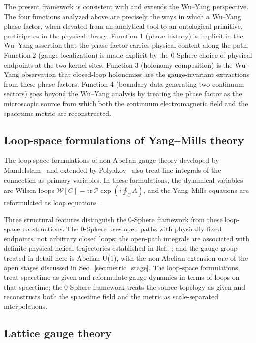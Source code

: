 \documentclass[%
 reprint, amsmath,amssymb, aps, prb, ]{revtex4-2}
\numberwithin{equation}{section}
\newcommand{\WL}{\mathcal{W}}
\begin{document}
The present framework is consistent with and extends the Wu--Yang perspective. The four functions analyzed above are precisely the ways in which a Wu--Yang phase factor, when elevated from an analytical tool to an ontological primitive, participates in the physical theory. Function 1 (phase history) is implicit in the Wu--Yang assertion that the phase factor carries physical content along the path. Function 2 (gauge localization) is made explicit by the 0-Sphere choice of physical endpoints at the two kernel sites. Function 3 (holonomy composition) is the Wu--Yang observation that closed-loop holonomies are the gauge-invariant extractions from these phase factors. Function 4 (boundary data generating two continuum sectors) goes beyond the Wu--Yang analysis by treating the phase factor as the microscopic source from which both the continuum electromagnetic field and the spacetime metric are reconstructed.

\subsection{Loop-space formulations of Yang--Mills theory}

The loop-space formulations of non-Abelian gauge theory developed by Mandelstam~\cite{Mandelstam1968} and extended by Polyakov~\cite{Polyakov1979} also treat line integrals of the connection as primary variables. In these formulations, the dynamical variables are Wilson loops $\WL[C] = \text{tr}\,\mathcal{P}\exp(i \oint_C A)$, and the Yang--Mills equations are reformulated as loop equations~\cite{MigdalMakeenko1979}.

Three structural features distinguish the 0-Sphere framework from these loop-space constructions. The 0-Sphere uses open paths with physically fixed endpoints, not arbitrary closed loops; the open-path integrals are associated with definite physical helical trajectories established in Ref.~\cite{hanamura51}; and the gauge group treated in detail here is Abelian U(1), with the non-Abelian extension one of the open stages discussed in Sec.~\ref{sec:metric_stage}. The loop-space formulations treat spacetime as given and reformulate gauge dynamics in terms of loops on that spacetime; the 0-Sphere framework treats the source topology as given and reconstructs both the spacetime field and the metric as scale-separated interpolations.

\subsection{Lattice gauge theory}
\end{document}
